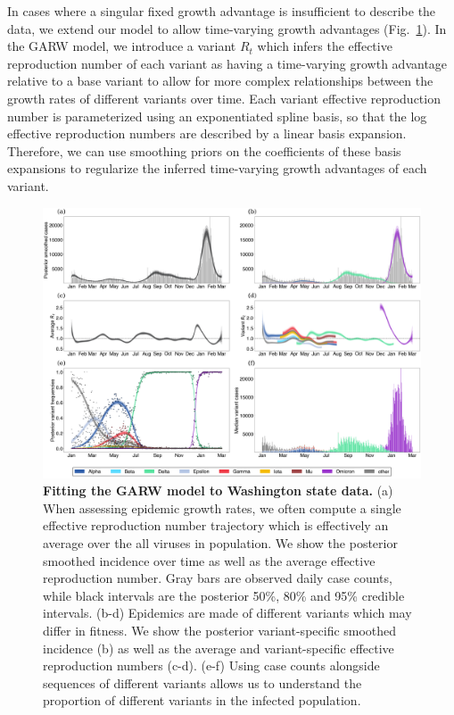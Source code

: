 \documentclass[11pt,oneside,letterpaper]{article}
\begin{document}
In cases where a singular fixed growth advantage is insufficient to describe the data, we extend our model to allow time-varying growth advantages (Fig.~\ref{fig:GARW_rt_Washington}).
In the GARW model, we introduce a variant $R_{t}$ which infers the effective reproduction number of each variant as having a time-varying growth advantage relative to a base variant to allow for more complex relationships between the growth rates of different variants over time.
Each variant effective reproduction number is parameterized using an exponentiated spline basis, so that the log effective reproduction numbers are described by a linear basis expansion.
Therefore, we can use smoothing priors on the coefficients of these basis expansions to regularize the inferred time-varying growth advantages of each variant.

\begin{figure}[h!]
  \centering
  \includegraphics[width=\linewidth]{figs/GARW_rt_Washington.png}
  \caption{\textbf{Fitting the GARW model to Washington state data.}
    (a) When assessing epidemic growth rates, we often compute a single effective reproduction number trajectory which is effectively an average over the all viruses in population. We show the posterior smoothed incidence over time as well as the average effective reproduction number.
    Gray bars are observed daily case counts, while black intervals are the posterior 50\%, 80\% and 95\% credible intervals.
    (b-d) Epidemics are made of different variants which may differ in fitness.
    We show the posterior variant-specific smoothed incidence (b) as well as the average and variant-specific effective reproduction numbers (c-d).
    (e-f) Using case counts alongside sequences of different variants allows us to understand the proportion of different variants in the infected population.
    }
  \label{fig:GARW_rt_Washington}
\end{figure}
\end{document}
